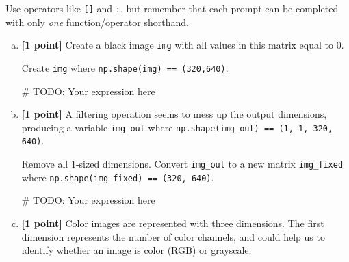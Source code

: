 \documentclass[11pt]{article}
\begin{document}
Use operators like \texttt{[]} and \texttt{:}, but remember that each prompt can be completed with only \textit{one} function/operator shorthand.

\begin{enumerate}[(a)]
    \item \textbf{[1 point]} Create a black image \texttt{img} with all values in this matrix equal to 0. 
    
    \begin{tcolorbox}[colback=orange!5!white,colframe=orange!75!black]
    Create \texttt{img} where \texttt{np.shape(img) == (320,640)}.
    \end{tcolorbox}
    
    \begin{tcolorbox}[colback=white!5!white,colframe=green!75!black,height=2cm]
    \begin{python}
    # TODO: Your expression here
    \end{python}
    \end{tcolorbox}
    
    \item \textbf{[1 point]} A filtering operation seems to mess up the output dimensions, producing a variable \texttt{img\_out} where \texttt{np.shape(img\_out) == (1, 1, 320, 640)}.
    
    \begin{tcolorbox}[colback=orange!5!white,colframe=orange!75!black]
    Remove all 1-sized dimensions. Convert \texttt{img\_out} to a new matrix \texttt{img\_fixed} where \texttt{np.shape(img\_fixed) == (320, 640)}.
    \end{tcolorbox}

\begin{tcolorbox}[colback=white!5!white,colframe=green!75!black,height=2cm]
    \begin{python}
    # TODO: Your expression here
    \end{python}
    \end{tcolorbox}
    
    \pagebreak
    \item \textbf{[1 point]} Color images are represented with three dimensions. The first dimension represents the number of color channels, and could help us to identify whether an image is color (RGB) or grayscale. 
    

\end{enumerate}
\end{document}
